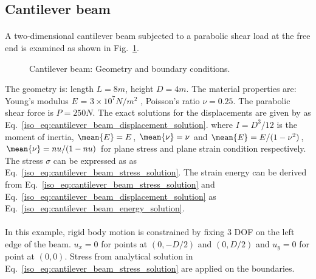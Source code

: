 \subsection{Cantilever beam}
\paragraph{}
A two-dimensional cantilever beam subjected to a parabolic shear load at the free end is examined as shown in Fig.~\ref{qdt_fig:ex_cantilever_beam_geo_bc}.
    \begin{figure}[h!]
    \centering
        \caption{ Cantilever beam: Geometry and boundary conditions.}
        \label{qdt_fig:ex_cantilever_beam_geo_bc}
    \end{figure}
%
The geometry is: length $L=8m$, height $D=4m$.
The material properties are: Young’s modulus $E$ = $3 \times 10^7 N/m^2$ , Poisson’s ratio $ \nu =0.25$.
The parabolic shear force is $P = 250 N$.
The exact solutions for the displacements are given by \citep{Aug2008} as Eq.~\ref{iso_eq:cantilever_beam_displacement_solution}.
where $I=D^3/12$ is the moment of inertia, $\mean{E}=E$, $\mean{\nu}=\nu$ and $\mean{E}=E/(1-\nu^2)$, $\mean{\nu}=nu/(1-nu)$ for plane stress and plane strain condition respectively.
The stress $\sigma$ can be expressed as \citep{Aug2008} as Eq.~\ref{iso_eq:cantilever_beam_stress_solution}.
The strain energy can be derived from Eq.~\ref{iso_eq:cantilever_beam_stress_solution} and Eq.~\ref{iso_eq:cantilever_beam_displacement_solution} as Eq.~\ref{iso_eq:cantilever_beam_energy_solution}.

\paragraph{}
In this example, rigid body motion is constrained by fixing 3 DOF on the left edge of the beam.
$u_x=0$ for points at $(0,-D/2)$ and $(0,D/2)$ and $u_y =0$ for point at $(0,0)$.
Stress from analytical solution in Eq.~\ref{iso_eq:cantilever_beam_stress_solution} are applied on the boundaries.

